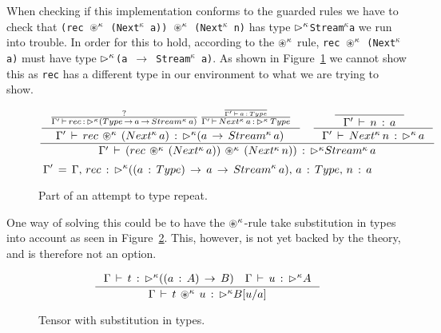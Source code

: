 When checking if this implementation conforms to the guarded rules we have to
check that \texttt{(rec $\circledast ^{\kappa}$ (Next$^{\kappa}$ a)) $\circledast ^{\kappa}$ (Next$^{\kappa}$ n)} has type
\texttt{$\rhd ^{\kappa}$Stream$^{\kappa}$a} we run into trouble. In order for this to hold,
according to the $\circledast ^{\kappa}$ rule, \texttt{rec $\circledast ^{\kappa}$ (Next$^{\kappa}$ a)} must have
type \texttt{$\rhd^{\kappa}$(a $\rightarrow$ Stream$^{\kappa}$ a)}. As shown in
Figure~\ref{fig:repeat_typing} we cannot show this as \texttt{rec} has a
different type in our environment to what we are trying to show.

\begin{figure}[h]
\[
\frac { \begin{matrix} \inference { \frac { ? }{ \Gamma '\, \vdash \, rec\, :\, \later
        ^{\kappa}(Type\, \rightarrow \, a\, \rightarrow \, Stream^{\kappa}\, a) } \, 
      \frac {
        \frac {  }{ \Gamma '\, \vdash \, a\, :\, Type } 
      }
      { \Gamma '\, \vdash \,
        Next^{\kappa}\, a\, :\, \later ^{\kappa}\, Type }
    }{ \, \Gamma '\, \vdash \, rec\,
      \tensor ^{\kappa} \, (Next^{\kappa}\, a)\, :\, \later ^{\kappa}(a\, \rightarrow \, Stream^{\kappa}\,
      a)\ }  & \inference { \inference {  }{ \Gamma '\, \vdash \, n\, :\, a }  }{
      \Gamma '\, \vdash \, Next^{\kappa}\, n\, :\, \later ^{\kappa} \, a }  \end{matrix} }{
  \Gamma '\, \vdash \, (rec\, \tensor ^{\kappa} \, (Next^{\kappa}\, a))\, \tensor ^{\kappa} \,
  (Next^{\kappa}\, n))\, :\, \later ^{\kappa} Stream^{\kappa}\, a }
\]
\[
\Gamma '\, =\, \Gamma ,\, rec\, :\, \rhd ^{\kappa}((a\, :\, Type)\, \rightarrow \,
a\, \rightarrow \, Stream^{\kappa}\, a),\, a\, :\, Type,\, n\, :\, a
\]
  \caption{Part of an attempt to type repeat.}
  \label{fig:repeat_typing}
\end{figure}

One way of solving this could be to have the $\circledast ^{\kappa}$-rule take substitution in
types into account as seen in Figure~\ref{fig:tensor_with_subst}. This, however,
is not yet backed by the theory, and is therefore not an option.

\begin{figure}[h]
\[
\inference { \Gamma \, \vdash \, t\, :\, \later^{\kappa} ((a\, :\, A)\,
  \rightarrow \, B)\quad \Gamma \, \vdash \, u\, :\, \later^{\kappa} A }{
  \Gamma \, \vdash \, t\, \tensor ^{\kappa} \, u\, :\, \later^{\kappa} B[{ u
  }/{ a }] } 
\]
  \caption{Tensor with substitution in types.}
  \label{fig:tensor_with_subst}
\end{figure}

